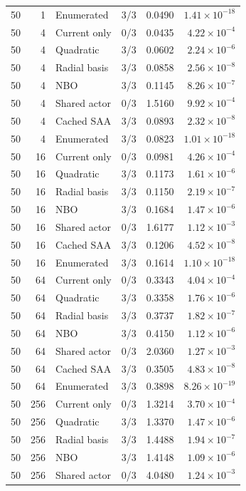 \begin{longtable}{rrlrrr}
50 & 1 & Enumerated & 3/3 & 0.0490 & $1.41\times10^{-18}$\\
50 & 4 & Current only & 0/3 & 0.0435 & $4.22\times10^{-4}$\\
50 & 4 & Quadratic & 3/3 & 0.0602 & $2.24\times10^{-6}$\\
50 & 4 & Radial basis & 3/3 & 0.0858 & $2.56\times10^{-8}$\\
50 & 4 & NBO & 3/3 & 0.1145 & $8.26\times10^{-7}$\\
50 & 4 & Shared actor & 0/3 & 1.5160 & $9.92\times10^{-4}$\\
50 & 4 & Cached SAA & 3/3 & 0.0893 & $2.32\times10^{-8}$\\
50 & 4 & Enumerated & 3/3 & 0.0823 & $1.01\times10^{-18}$\\
50 & 16 & Current only & 0/3 & 0.0981 & $4.26\times10^{-4}$\\
50 & 16 & Quadratic & 3/3 & 0.1173 & $1.61\times10^{-6}$\\
50 & 16 & Radial basis & 3/3 & 0.1150 & $2.19\times10^{-7}$\\
50 & 16 & NBO & 3/3 & 0.1684 & $1.47\times10^{-6}$\\
50 & 16 & Shared actor & 0/3 & 1.6177 & $1.12\times10^{-3}$\\
50 & 16 & Cached SAA & 3/3 & 0.1206 & $4.52\times10^{-8}$\\
50 & 16 & Enumerated & 3/3 & 0.1614 & $1.10\times10^{-18}$\\
50 & 64 & Current only & 0/3 & 0.3343 & $4.04\times10^{-4}$\\
50 & 64 & Quadratic & 3/3 & 0.3358 & $1.76\times10^{-6}$\\
50 & 64 & Radial basis & 3/3 & 0.3737 & $1.82\times10^{-7}$\\
50 & 64 & NBO & 3/3 & 0.4150 & $1.12\times10^{-6}$\\
50 & 64 & Shared actor & 0/3 & 2.0360 & $1.27\times10^{-3}$\\
50 & 64 & Cached SAA & 3/3 & 0.3505 & $4.83\times10^{-8}$\\
50 & 64 & Enumerated & 3/3 & 0.3898 & $8.26\times10^{-19}$\\
50 & 256 & Current only & 0/3 & 1.3214 & $3.70\times10^{-4}$\\
50 & 256 & Quadratic & 3/3 & 1.3370 & $1.47\times10^{-6}$\\
50 & 256 & Radial basis & 3/3 & 1.4488 & $1.94\times10^{-7}$\\
50 & 256 & NBO & 3/3 & 1.4148 & $1.09\times10^{-6}$\\
50 & 256 & Shared actor & 0/3 & 4.0480 & $1.24\times10^{-3}$\\

\end{longtable}
